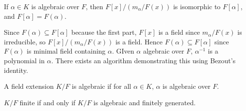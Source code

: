\documentclass{article}                                                        %
\begin{document}
        \begin{theorem}
            If $\alpha\in{K}$ is algebraic over $F$, then
            $F[x]/(m_{\alpha}/F(x))$ is isomorphic to $F[\alpha]$, and
            $F[\alpha]=F(\alpha)$.
        \end{theorem}
        Since $F(\alpha)\subseteq{F}[\alpha]$ because the first part,
        $F[x]$ is a field since $m_{\alpha}/F(x)$ is irreducible, so
        $F[x]/(m_{\alpha}/F(x))$ is a field. Hence
        $F(\alpha)\subseteq{F}[\alpha]$ since $F(\alpha)$ is minimal field
        containing $\alpha$. GIven $\alpha$ algebraic over $F$,
        $\alpha^{\minus{1}}$ is a polynomial in $\alpha$. There exists an
        algorithm demonstrating this using Bezout's identity.
        \begin{definition}
            A field extension $K/F$ is algebraic if for all $\alpha\in{K}$,
            $\alpha$ is algebraic over $F$.
        \end{definition}
        \begin{theorem}
            $K/F$ finite if and only if $K/F$ is algebraic and finitely
            generated.
        \end{theorem}
\end{document}
